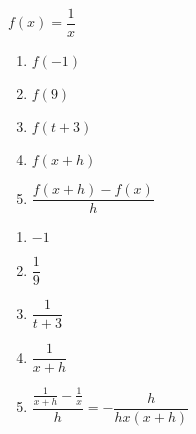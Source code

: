 {$f(x)=\dfrac1x$\\
\begin{minipage}{.5\linewidth}
\begin{enumerate}
\item $f(-1)$
\item $f(9)$
\item $f(t+3)$
\end{enumerate}
\end{minipage}%
\begin{minipage}{.5\linewidth}
\begin{enumerate}
\setcounter{enumi}{3}
\item $f(x+h)$
\item $\dfrac{f(x+h)-f(x)}{h}$
\end{enumerate}
\end{minipage}}
{\begin{enumerate}
\item $-1$
\item $\dfrac19$
\item $\dfrac1{t+3}$
\item $\dfrac1{x+h}$
\item $\dfrac{\frac1{x+h}-\frac1x}h=-\dfrac h{hx(x+h)}$
\end{enumerate}}
